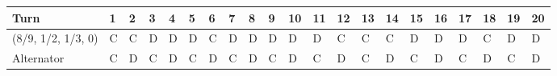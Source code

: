 \begin{tabular}{lllllllllllllllllllll}
\toprule
Turn               &  1 &  2 &  3 &  4 &  5 &  6 &  7 &  8 &  9 &  10 &  11 &  12 &  13 &  14 &  15 &  16 &  17 &  18 &  19 &  20 \\\midrule
(8/9, 1/2, 1/3, 0) &  C &  C &  D &  D &  D &  C &  D &  D &  D &   D &   D &   C &   C &   C &   D &   D &   D &   C &   D &   D \\
Alternator         &  C &  D &  C &  D &  C &  D &  C &  D &  C &   D &   C &   D &   C &   D &   C &   D &   C &   D &   C &   D \\
\bottomrule
\end{tabular}
